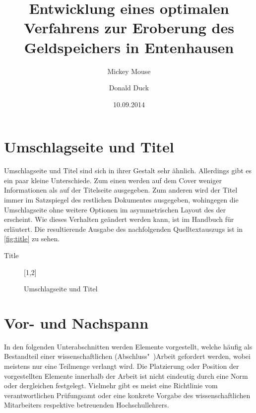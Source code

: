 \documentclass[%
  english,ngerman,%
  geometry=no,DIV=12,automark,%
]{tudscrartcl}
\begin{document}
\section{Umschlagseite und Titel}
Umschlagseite und Titel sind sich in ihrer Gestalt sehr ähnlich. Allerdings 
gibt es ein paar kleine Unterschiede. Zum einen werden auf dem Cover weniger 
Informationen als auf der Titelseite ausgegeben. Zum anderen wird der Titel 
immer im Satzspiegel des restlichen Dokumentes ausgegeben, wohingegen die 
Umschlagseite ohne weitere Optionen im asymmetrischen Layout des \CDs der \TnUD 
erscheint. Wie dieses Verhalten geändert werden kann, ist im Handbuch für 
 erläutert. Die resultierende Ausgabe des nachfolgenden 
Quelltextauszugs ist in \autoref{fig:title} zu sehen.
%
\begin{Excerpt!}{Title}
\title{%
  Entwicklung eines optimalen Verfahrens zur Eroberung des
  Geldspeichers in Entenhausen
}
\author{%
  Mickey Mouse
  \and%
  Donald Duck
}
\date{10.09.2014}
\makecover
\maketitle
\end{Excerpt!}
%
\begin{figure}
[1,2]
\caption{Umschlagseite und Titel}
\label{fig:title}
\end{figure}



\section{Vor- und Nachspann}
In den folgenden Unterabschnitten werden Elemente vorgestellt, welche häufig 
als Bestandteil einer wissenschaftlichen (Abschluss"~)Arbeit gefordert werden, 
wobei meistens nur eine Teilmenge verlangt wird. Die Platzierung oder Position 
der vorgestellten Elemente innerhalb der Arbeit ist nicht eindeutig durch eine 
Norm oder dergleichen festgelegt. Vielmehr gibt es meist eine Richtlinie vom 
verantwortlichen Prüfungsamt oder eine konkrete Vorgabe des wissenschaftlichen 
Mitarbeiters respektive betreuenden Hochschullehrers.
\end{document}
